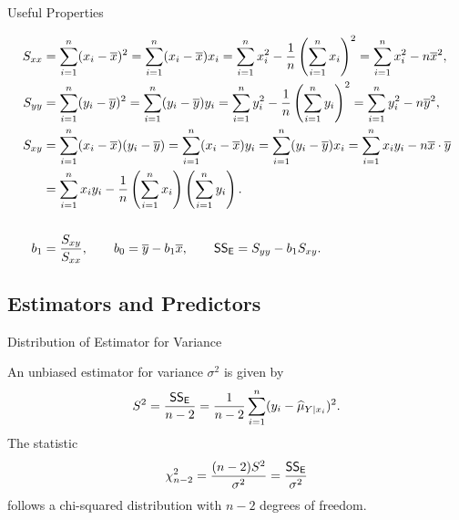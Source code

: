 \begin{frame}{Useful Properties}

\justifying
{}
\footnotesize
\begin{align*}
S_{xx} & = \sum_{i=1}^n (x_i - \overline{x})^2 = \sum_{i=1}^n (x_i - \overline{x})x_i = \sum_{i=1}^n x_i^2 - \frac{1}{n}\left(\sum_{i=1}^n x_i\right)^2  = \sum_{i=1}^n x_i^2 - n\overline{x}^2, \\
S_{yy} & = \sum_{i=1}^n (y_i - \overline{y})^2 = \sum_{i=1}^n (y_i - \overline{y})y_i = \sum_{i=1}^n y_i^2 - \frac{1}{n}\left(\sum_{i=1}^n y_i\right)^2 = \sum_{i=1}^n y_i^2 - n\overline{y}^2, \\
S_{xy} & = \sum_{i=1}^n (x_i - \overline{x})(y_i - \overline{y}) = \sum_{i=1}^n (x_i - \overline{x})y_i = \sum_{i=1}^n (y_i - \overline{y})x_i = \sum_{i=1}^n x_iy_i - n\overline{x}\cdot\overline{y} \\
& = \sum_{i=1}^n x_iy_i - \frac{1}{n}\left(\sum_{i=1}^n x_i \right)\left(\sum_{i=1}^n y_i \right). \\\\
b_1 & = \frac{S_{xy}}{S_{xx}}, \qquad b_0 = \overline{y} - b_1\overline{x},\qquad \mathsf{SS_E} = S_{yy} - b_1 S_{xy}.
\end{align*}

\end{frame}

\subsection{Estimators and Predictors}

\begin{frame}{Distribution of Estimator for Variance}

 An unbiased estimator for variance $\sigma^2$ is given by
\begin{align*}
S^2 = \frac{\mathsf{SS_E}}{n-2} = \frac{1}{n-2}\sum_{i=1}^n (y_i-\widehat{\mu}_{Y|x_i})^2.
\end{align*}
 The statistic
\begin{align*}
\chi_{n-2}^2 = \frac{(n-2)S^2}{\sigma^2} = \frac{\mathsf{SS_E}}{\sigma^2}
\end{align*}
follows a chi-squared distribution with $n-2$ degrees of freedom.

\end{frame}

